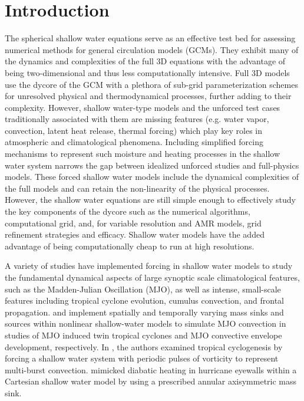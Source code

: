\section{Introduction}
The spherical shallow water equations serve as an effective test bed for 
assessing numerical methods for general circulation models (GCMs). They 
exhibit many of the dynamics and complexities of the full 3D equations with 
the advantage of being two-dimensional and thus less computationally intensive.  
Full 3D models use the dycore of the GCM with
 a plethora of sub-grid parameterization 
schemes for unresolved physical and thermodynamical processes, further 
adding to their complexity.  However, shallow water-type models and 
the unforced test cases traditionally associated with them \citep{Williamson:1992kx}
are missing features (e.g. water vapor, convection, latent heat release, 
thermal forcing) which play key roles in atmospheric and 
climatological phenomena. Including simplified forcing mechanisms to represent 
such moisture and heating
processes in the shallow 
water system narrows the gap between idealized unforced studies 
and full-physics models. These forced shallow water 
models include the dynamical complexities of the full models and can retain
the non-linearity of the physical processes.  However,
the shallow water equations are still simple enough to effectively study
the key components of the dycore such as the numerical algorithms,
computational grid, and, for variable resolution and AMR models, grid refinement
strategies and efficacy. Shallow water models have the added advantage of being
computationally cheap to run at high resolutions.

A variety of studies have implemented forcing in shallow water models to study
 the fundamental dynamical aspects of large synoptic
scale climatological features, such as the Madden-Julian Oscillation (MJO),
as well as intense, small-scale features including tropical cyclone 
evolution, cumulus convection, and frontal propagation.
\cite{ferreira1996dynamical} and \cite{yang2013triggered} implement
spatially and temporally varying mass sinks and sources within nonlinear 
shallow-water models to simulate MJO convection in studies of MJO
induced twin tropical cyclones and MJO convective envelope 
development, respectively. In \cite{enagonio2001tropical}, 
the authors examined tropical cyclogenesis
by forcing a shallow water system with periodic pulses of vorticity to represent multi-burst convection.
 \cite{hendricks2014hurricane} mimicked diabatic heating in hurricane 
eyewalls within a Cartesian shallow water model by using a prescribed annular
 axisymmetric mass sink.


